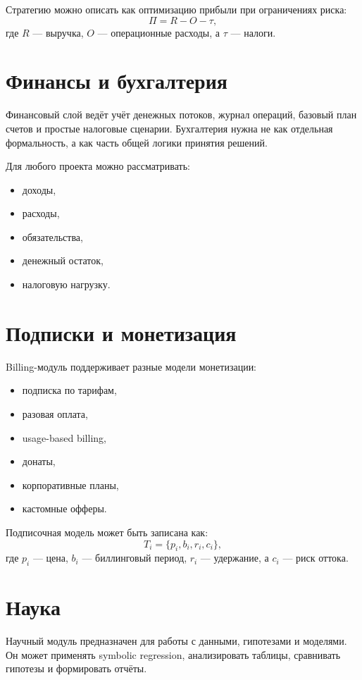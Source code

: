 \documentclass[11pt,a4paper]{article}
\begin{document}
Стратегию можно описать как оптимизацию прибыли при ограничениях риска:
\[
\Pi = R - O - \tau,
\]
где $R$ — выручка, $O$ — операционные расходы, а $\tau$ — налоги.

\section{Финансы и бухгалтерия}

Финансовый слой ведёт учёт денежных потоков, журнал операций, базовый план счетов и простые налоговые сценарии.  
Бухгалтерия нужна не как отдельная формальность, а как часть общей логики принятия решений.

Для любого проекта можно рассматривать:
\begin{itemize}[leftmargin=1.2cm]
    \item доходы,
    \item расходы,
    \item обязательства,
    \item денежный остаток,
    \item налоговую нагрузку.
\end{itemize}

\section{Подписки и монетизация}

Billing-модуль поддерживает разные модели монетизации:
\begin{itemize}[leftmargin=1.2cm]
    \item подписка по тарифам,
    \item разовая оплата,
    \item usage-based billing,
    \item донаты,
    \item корпоративные планы,
    \item кастомные офферы.
\end{itemize}

Подписочная модель может быть записана как:
\[
T_i = \{p_i, b_i, r_i, c_i\},
\]
где $p_i$ — цена, $b_i$ — биллинговый период, $r_i$ — удержание, а $c_i$ — риск оттока.

\section{Наука}

Научный модуль предназначен для работы с данными, гипотезами и моделями.  
Он может применять symbolic regression, анализировать таблицы, сравнивать гипотезы и формировать отчёты.
\end{document}
